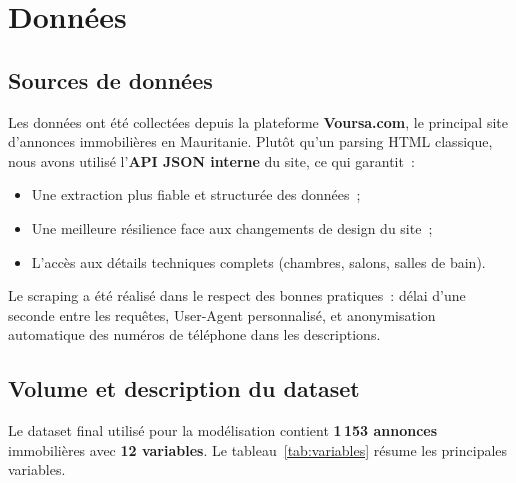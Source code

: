 \documentclass[12pt, a4paper]{article}
\begin{document}
\section{Données}

\subsection{Sources de données}

Les données ont été collectées depuis la plateforme \textbf{Voursa.com}, le principal site d'annonces immobilières en Mauritanie. Plutôt qu'un parsing HTML classique, nous avons utilisé l'\textbf{API JSON interne} du site, ce qui garantit~:
\begin{itemize}
    \item Une extraction plus fiable et structurée des données~;
    \item Une meilleure résilience face aux changements de design du site~;
    \item L'accès aux détails techniques complets (chambres, salons, salles de bain).
\end{itemize}

Le scraping a été réalisé dans le respect des bonnes pratiques~: délai d'une seconde entre les requêtes, User-Agent personnalisé, et anonymisation automatique des numéros de téléphone dans les descriptions.

\subsection{Volume et description du dataset}

Le dataset final utilisé pour la modélisation contient \textbf{1\,153 annonces} immobilières avec \textbf{12 variables}. Le tableau~\ref{tab:variables} résume les principales variables.
\end{document}
